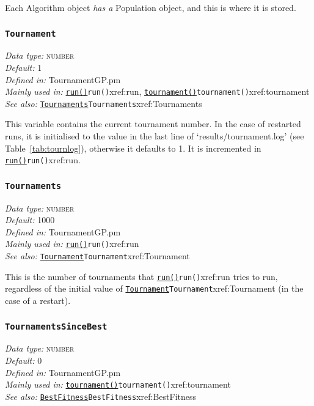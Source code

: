 \documentclass[a4paper]{article}
\begin{document}
Each Algorithm object \textit{has a} Population object, and this is
where it is stored.

\subsubsection{\texttt{Tournament}}\label{xref:Tournament}
\begin{flushleft}
\textit{Data type:} \textsc{number}\\
\textit{Default:} 1\\
\textit{Defined in:} TournamentGP.pm\\
\textit{Mainly used in:} \hyperref[no]{\texttt{run()}}{\texttt{run()}}{xref:run}, \hyperref[no]{\texttt{tournament()}}{\texttt{tournament()}}{xref:tournament}\\
\textit{See also:} \hyperref[no]{\texttt{Tournaments}}{\texttt{Tournaments}}{xref:Tournaments}
\end{flushleft}

This variable contains the current tournament number.  In the case of
restarted runs, it is initialised to the value in the last line of
`results/tournament.log' (see Table~\ref{tab:tournlog}), otherwise it
defaults to 1.  It is incremented in \hyperref[no]{\texttt{run()}}{\texttt{run()}}{xref:run}.

\subsubsection{\texttt{Tournaments}}\label{xref:Tournaments}
\begin{flushleft}
\textit{Data type:} \textsc{number}\\
\textit{Default:} 1000\\
\textit{Defined in:} TournamentGP.pm\\
\textit{Mainly used in:} \hyperref[no]{\texttt{run()}}{\texttt{run()}}{xref:run}\\
\textit{See also:} \hyperref[no]{\texttt{Tournament}}{\texttt{Tournament}}{xref:Tournament}
\end{flushleft}

This is the number of tournaments that \hyperref[no]{\texttt{run()}}{\texttt{run()}}{xref:run} tries to run,
regardless of the initial value of \hyperref[no]{\texttt{Tournament}}{\texttt{Tournament}}{xref:Tournament} (in the case of
a restart).

\subsubsection{\texttt{TournamentsSinceBest}}\label{xref:TournamentsSinceBest}
\begin{flushleft}
\textit{Data type:} \textsc{number}\\
\textit{Default:} 0\\
\textit{Defined in:} TournamentGP.pm\\
\textit{Mainly used in:} \hyperref[no]{\texttt{tournament()}}{\texttt{tournament()}}{xref:tournament}\\
\textit{See also:} \hyperref[no]{\texttt{BestFitness}}{\texttt{BestFitness}}{xref:BestFitness}
\end{flushleft}
\end{document}

